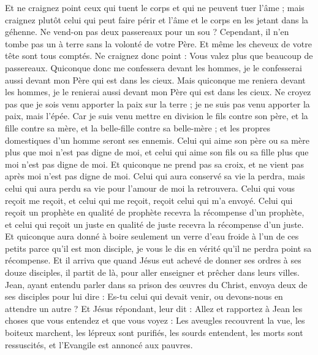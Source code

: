 \begin{multicols}{2}
Et ne craignez point ceux qui tuent le corps et qui ne peuvent tuer l'âme ; mais craignez plutôt celui qui peut faire périr et l'âme et le corps en les jetant dans la géhenne.
Ne vend-on pas deux passereaux pour un sou ? Cependant, il n'en tombe pas un à terre sans la volonté de votre Père.
Et même les cheveux de votre tête sont tous comptés.
Ne craignez donc point : Vous valez plus que beaucoup de passereaux.
Quiconque donc me confessera devant les hommes, je le confesserai aussi devant mon Père qui est dans les cieux.
Mais quiconque me reniera devant les hommes, je le renierai aussi devant mon Père qui est dans les cieux.
Ne croyez pas que je sois venu apporter la paix sur la terre ; je ne suis pas venu apporter la paix, mais l'épée.
Car je suis venu mettre en division le fils contre son père, et la fille contre sa mère, et la belle-fille contre sa belle-mère ;
et les propres domestiques d'un homme seront ses ennemis.
Celui qui aime son père ou sa mère plus que moi n'est pas digne de moi, et celui qui aime son fils ou sa fille plus que moi n'est pas digne de moi.
Et quiconque ne prend pas sa croix, et ne vient pas après moi n'est pas digne de moi.
Celui qui aura conservé sa vie la perdra, mais celui qui aura perdu sa vie pour l'amour de moi la retrouvera.
Celui qui vous reçoit me reçoit, et celui qui me reçoit, reçoit celui qui m'a envoyé.
Celui qui reçoit un prophète en qualité de prophète recevra la récompense d'un prophète, et celui qui reçoit un juste en qualité de juste recevra la récompense d'un juste.
Et quiconque aura donné à boire seulement un verre d'eau froide à l'un de ces petits parce qu'il est mon disciple, je vous le dis en vérité qu'il ne perdra point sa récompense.
\VerseOne{}Et il arriva que quand Jésus eut achevé de donner ses ordres à ses douze disciples, il partit de là, pour aller enseigner et prêcher dans leurs villes.
Jean, ayant entendu parler dans sa prison des œuvres du Christ, envoya deux de ses disciples pour lui dire :
Es-tu celui qui devait venir, ou devons-nous en attendre un autre ?
Et Jésus répondant, leur dit : Allez et rapportez à Jean les choses que vous entendez et que vous voyez :
Les aveugles recouvrent la vue, les boiteux marchent, les lépreux sont purifiés, les sourds entendent, les morts sont ressuscités, et l'Evangile est annoncé aux pauvres.

\end{multicols}

